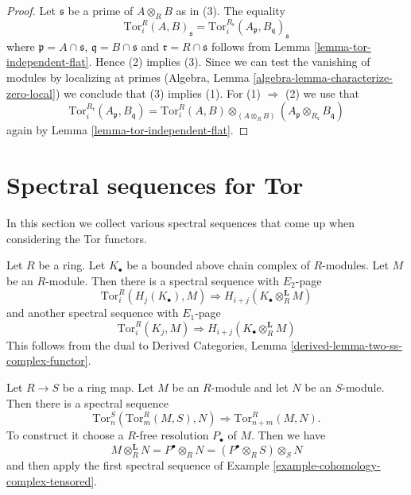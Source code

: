 \begin{proof}
Let $\mathfrak s$ be a prime of $A \otimes_R B$ as in (3).
The equality
$$
\text{Tor}_i^R(A, B)_\mathfrak s =
\text{Tor}_i^{R_\mathfrak r}(A_\mathfrak p, B_\mathfrak q)_\mathfrak s
$$
where $\mathfrak p = A \cap \mathfrak s$, $\mathfrak q = B \cap \mathfrak s$
and $\mathfrak r = R \cap \mathfrak s$ follows from
Lemma \ref{lemma-tor-independent-flat}.
Hence (2) implies (3).
Since we can test the vanishing of modules by localizing at primes
(Algebra, Lemma \ref{algebra-lemma-characterize-zero-local})
we conclude that (3) implies (1). For
(1) $\Rightarrow$ (2) we use that
$$
\text{Tor}_i^{R_\mathfrak r}(A_\mathfrak p, B_\mathfrak q) =
\text{Tor}_i^R(A, B) \otimes_{(A \otimes_R B)}
(A_\mathfrak p \otimes_{R_{\mathfrak r}} B_\mathfrak q)
$$
again by Lemma \ref{lemma-tor-independent-flat}.
\end{proof}








\section{Spectral sequences for Tor}
\label{section-spectral-sequence-tor}


\noindent
In this section we collect various spectral sequences that come up
when considering the Tor functors.

\begin{example}
\label{example-cohomology-complex-tensored}
Let $R$ be a ring. Let $K_\bullet$ be a bounded above chain complex
of $R$-modules. Let $M$ be an $R$-module. Then there is a
spectral sequence with $E_2$-page
$$
\text{Tor}^R_i(H_j(K_\bullet), M)
\Rightarrow
H_{i + j}(K_\bullet \otimes^{\mathbf{L}}_R M)
$$
and another spectral sequence with $E_1$-page
$$
\text{Tor}^R_i(K_j, M)
\Rightarrow
H_{i + j}(K_\bullet \otimes^{\mathbf{L}}_R M)
$$
This follows from the dual to
Derived Categories, Lemma \ref{derived-lemma-two-ss-complex-functor}.
\end{example}

\begin{example}
\label{example-tor-change-rings}
Let $R \to S$ be a ring map. Let $M$ be an $R$-module and let
$N$ be an $S$-module. Then there is a spectral sequence
$$
\text{Tor}^S_n(\text{Tor}^R_m(M, S), N) \Rightarrow
\text{Tor}^R_{n + m}(M, N).
$$
To construct it choose a $R$-free resolution $P_\bullet$ of $M$. Then we have
$$
M \otimes_R^{\mathbf{L}} N = P^\bullet \otimes_R N =
(P^\bullet \otimes_R S) \otimes_S N
$$
and then apply the first spectral sequence of
Example \ref{example-cohomology-complex-tensored}.
\end{example}

